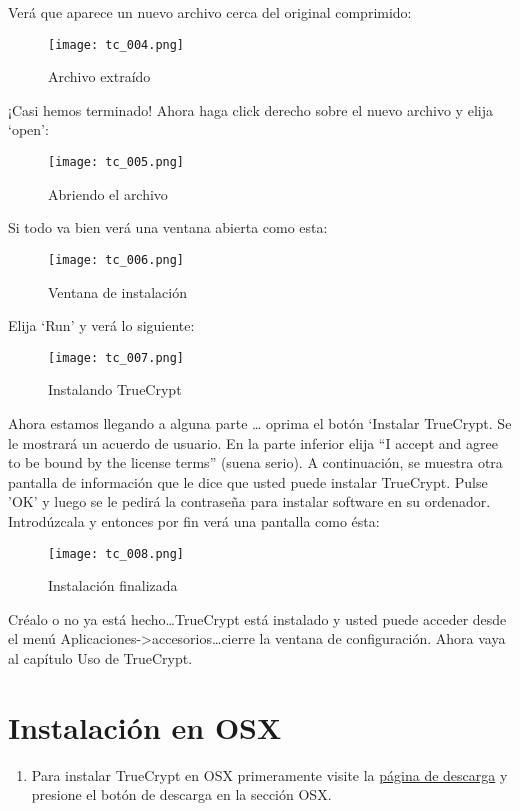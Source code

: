 \documentclass[10pt,a5paper,twoside,,]{book}
\providecommand{\tightlist}{%
  \setlength{\itemsep}{0pt}\setlength{\parskip}{0pt}}
\begin{document}
Verá que aparece un nuevo archivo cerca del original comprimido:

\begin{figure}[htbp]
\centering
\texttt{[image: tc\_004.png]}
\caption{Archivo extraído}
\end{figure}

¡Casi hemos terminado! Ahora haga click derecho sobre el nuevo archivo y
elija `open':

\begin{figure}[htbp]
\centering
\texttt{[image: tc\_005.png]}
\caption{Abriendo el archivo}
\end{figure}

Si todo va bien verá una ventana abierta como esta:

\begin{figure}[htbp]
\centering
\texttt{[image: tc\_006.png]}
\caption{Ventana de instalación}
\end{figure}

Elija `Run' y verá lo siguiente:

\begin{figure}[htbp]
\centering
\texttt{[image: tc\_007.png]}
\caption{Instalando TrueCrypt}
\end{figure}

Ahora estamos llegando a alguna parte \ldots{} oprima el botón `Instalar
TrueCrypt. Se le mostrará un acuerdo de usuario. En la parte inferior
elija ``I accept and agree to be bound by the license terms'' (suena
serio). A continuación, se muestra otra pantalla de información que le
dice que usted puede instalar TrueCrypt. Pulse 'OK' y luego se le pedirá
la contraseña para instalar software en su ordenador. Introdúzcala y
entonces por fin verá una pantalla como ésta:

\begin{figure}[htbp]
\centering
\texttt{[image: tc\_008.png]}
\caption{Instalación finalizada}
\end{figure}

Créalo o no ya está hecho\ldots{}TrueCrypt está instalado y usted puede
acceder desde el menú
Aplicaciones-\textgreater{}accesorios\ldots{}cierre la ventana de
configuración. Ahora vaya al capítulo Uso de TrueCrypt.

\section{Instalación en OSX}\label{instalaciuxf3n-en-osx}

\begin{enumerate}
\def\labelenumi{\arabic{enumi}.}
\tightlist
\item
  Para instalar TrueCrypt en OSX primeramente visite la
  \href{http://www.truecrypt.org/downloads}{página de descarga} y
  presione el botón de descarga en la sección OSX.
\end{enumerate}
\end{document}
